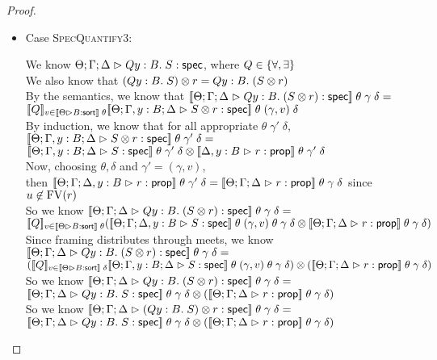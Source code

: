 \begin{proof}
\begin{itemize}
    \item Case \textsc{SpecQuantify3}:
      \begin{tabbedproof}
        \oo We know $\judgeS{Q y:B.\; S}$, where $Q \in \setof{\forall, \exists}$ \\
        \oo We also know that $\Frame{(Q y:B.\; S)}{r} = Q y:B.\; (\Frame{S}{r})$ \\
        \oo By the semantics, we know that $\interp{\judgeS{Q y:B.\; (\Frame{S}{r)}}}\;\theta\;\gamma\;\delta = $ \\
        \oox $\interp{Q}_{v \in \interp{\judgeSort{B}}\;\theta} \interp{\judgeS[\Theta; \Gamma, y:B; \Delta]{\Frame{S}{r}}}\;\theta\;(\gamma, v)\;\delta$\\
        \oo By induction, we know that for all appropriate $\theta\;\gamma'\;\delta$, 
               $\interp{\judgeS[\Theta; \Gamma, y:B; \Delta]{\Frame{S}{r}}}\;\theta\;\gamma'\;\delta = $ \\
        \oox $\Frame{\interp{\judgeS[\Theta; \Gamma, y:B; \Delta]{S}}\;\theta\;\gamma'\;\delta}{\interp{\judgeA[\Delta, y:B]{r}{\assert}}\;\theta\;\gamma'\;\delta}$ \\
        \oo Now, choosing $\theta, \delta$ and $\gamma' = (\gamma, v)$, \\
        \oox then $\interp{\judgeA[\Theta;\Gamma;\Delta, y:B]{r}{\assert}}\;\theta\;\gamma'\;\delta = 
                                                   \interp{\judgeA{r}{\assert}}\;\theta\;\gamma\;\delta$ since $u \not\in \FV{r}$ \\
        \oo So we know $\interp{\judgeS{Q y:B.\; (\Frame{S}{r)}}}\;\theta\;\gamma\;\delta = $ \\
        \oox $\interp{Q}_{v \in \interp{\judgeSort{B}}\;\theta} (\Frame{\interp{\judgeS[\Theta;\Gamma;\Delta, y:B]{S}}\;\theta\;(\gamma, v)\;\theta\;\gamma\;\delta}{\interp{\judgeA{r}{\assert}}\;\theta\;\gamma\;\delta})$ \\
        \oo Since framing distributes through meets, we know $\interp{\judgeS{Q y:B.\; (\Frame{S}{r)}}}\;\theta\;\gamma\;\delta = $ \\
        \oox $\Frame{(\interp{Q}_{v \in \interp{\judgeSort{B}}\;\delta} \interp{\judgeS[\Theta; \Gamma, y:B; \Delta]{S}}\;\theta\;(\gamma, v)\;\theta\;\gamma\;\delta)}{(\interp{\judgeA{r}{\assert}}\;\theta\;\gamma\;\delta})$ \\
        \oo So we know $\interp{\judgeS{Q y:B.\; (\Frame{S}{r)}}}\;\theta\;\gamma\;\delta = $ \\
        \oox $\Frame{\interp{\judgeS{Q y:B.\;S}}\;\theta\;\gamma\;\delta}{(\interp{\judgeA{r}{\assert}}\;\theta\;\gamma\;\delta)}$ \\
        \oo So we know $\interp{\judgeS{\Frame{(Q y:B.\; S)}{r}}}\;\theta\;\gamma\;\delta = $ \\
        \oox $\Frame{\interp{\judgeS{Q y:B.\;S}}\;\theta\;\gamma\;\delta}{(\interp{\judgeA{r}{\assert}}\;\theta\;\gamma\;\delta)}$ \\        
      \end{tabbedproof}


\end{itemize}
\end{proof}

